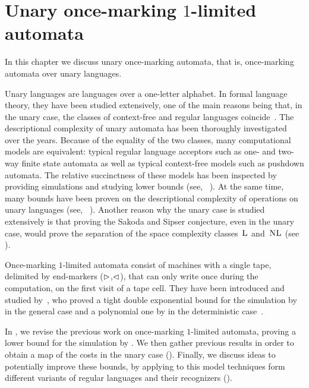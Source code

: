 \chapter{Unary once-marking \texorpdfstring{$1$}{1}-limited automata}\label{ch:oncemarking}
In this chapter we discuss unary once-marking automata, that is, once-marking automata over unary languages.

Unary languages are languages over a one-letter alphabet.
In formal language theory, they have been studied extensively, one of the main reasons being that, in the unary case, the classes of context-free and regular languages coincide~\cite{GinRic62}.
The descriptional complexity of unary automata has been thoroughly investigated over the years.
Because of the equality of the two classes, many computational models are equivalent: typical regular language acceptors such as one- and two-way finite state automata as well as typical context-free models such as pushdown automata.
The relative succinctness of these models has been inspected by providing simulations and studying lower bounds (see, \eg[,]~\cite{GefMer+03,MerPig01,Pig09,PigSha+02}).
At the same time, many bounds have been proven on the descriptional complexity of operations on unary languages (see, \eg[,]~\cite{HolKut03,KunOkh12,MerPig05,PigSha02}).
Another reason why the unary case is studied extensively is that proving the Sakoda and Sipser conjecture, even in the unary case, would prove the separation of the space complexity classes~$\textsc{L}$ and~$\textsc{NL}$ (see ).

Once-marking $1$-limited automata consist of machines with a single tape, delimited by end-markers ($\rhd$,$\lhd$), that can only write once during the computation, on the first visit of a tape cell.
They have been introduced and studied by~\citeauthor{PigPri23a}, who proved a tight double exponential bound for the simulation by \ODFAs in the general case and a polynomial one by \TDFAs in the deterministic case~\cite{PigPri23a}.

In , we revise the previous work on once-marking $1$-limited automata, proving a lower bound for the simulation by \ONFAs.
We then gather previous results in order to obtain a map of the costs in the unary case ().
Finally, we discuss ideas to potentially improve these bounds, by applying to this model techniques form different variants of regular languages and their recognizers ().



